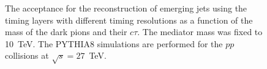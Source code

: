 \begin{figure}
\begin{center}

\end{center}
\caption{
The acceptance for the reconstruction of emerging jets using the timing layers with different timing resolutions as
a function of the mass of the dark pions and their $c\tau$. The mediator mass was fixed to 10~TeV. The PYTHIA8 simulations are performed 
for the $pp$ collisions at $\sqrt{s}=27$~TeV. 
}
\label{fig:efficiency}
\end{figure}

